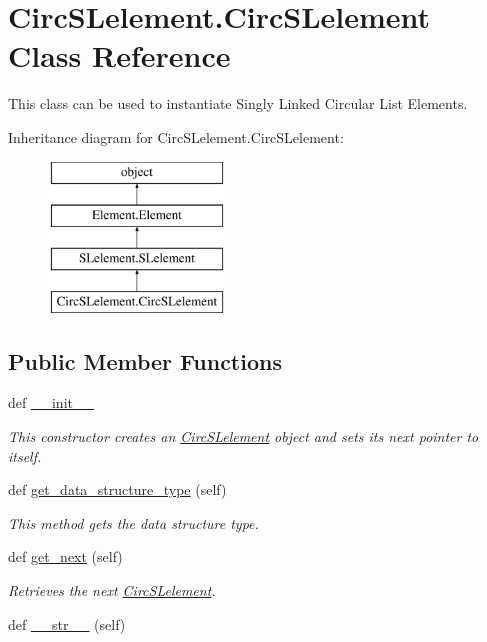 \hypertarget{class_circ_s_lelement_1_1_circ_s_lelement}{}\section{Circ\+S\+Lelement.\+Circ\+S\+Lelement Class Reference}
\label{class_circ_s_lelement_1_1_circ_s_lelement}


This class can be used to instantiate Singly Linked Circular List Elements.  


Inheritance diagram for Circ\+S\+Lelement.\+Circ\+S\+Lelement\+:\begin{figure}[H]
\begin{center}
\leavevmode
\includegraphics[height=4.000000cm]{class_circ_s_lelement_1_1_circ_s_lelement}
\end{center}
\end{figure}
\subsection*{Public Member Functions}
\begin{DoxyCompactItemize}
\item 
def \hyperlink{class_circ_s_lelement_1_1_circ_s_lelement_a4e75a1838fda7127fa5b1ae37b7c3a97}{\+\_\+\+\_\+init\+\_\+\+\_\+}
\begin{DoxyCompactList}\small\item\em This constructor creates an \hyperlink{class_circ_s_lelement_1_1_circ_s_lelement}{Circ\+S\+Lelement} object and sets its next pointer to itself. \end{DoxyCompactList}\item 
def \hyperlink{class_circ_s_lelement_1_1_circ_s_lelement_affcfd41e826ec28da6d3f3b89463457a}{get\+\_\+data\+\_\+structure\+\_\+type} (self)
\begin{DoxyCompactList}\small\item\em This method gets the data structure type. \end{DoxyCompactList}\item 
def \hyperlink{class_circ_s_lelement_1_1_circ_s_lelement_ae4b14fdaf7123cde09b78f8b65101c7c}{get\+\_\+next} (self)
\begin{DoxyCompactList}\small\item\em Retrieves the next \hyperlink{class_circ_s_lelement_1_1_circ_s_lelement}{Circ\+S\+Lelement}. \end{DoxyCompactList}\item 
def \hyperlink{class_circ_s_lelement_1_1_circ_s_lelement_ae75eb1b91bebd77b39fdb2c3345ded4b}{\+\_\+\+\_\+str\+\_\+\+\_\+} (self)
\end{DoxyCompactItemize}
